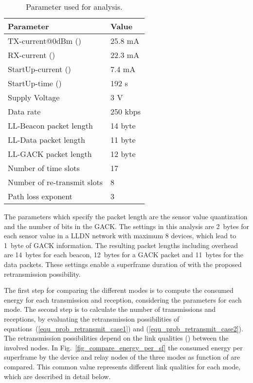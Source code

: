 \documentclass[times,10pt,twocolumn]{article}
\begin{document}
\begin{table}[h!]
\caption{Parameter used for analysis.}
\label{table_parameter}
\begin{tabular*}{8.1cm}{ll}
\hline
Parameter \hspace{4cm} & Value   \\ \hline
TX-current@0dBm () & 25.8 mA \\
RX-current () & 22.3 mA\\
StartUp-current () & 7.4 mA\\
StartUp-time () & 192 s\\
Supply Voltage & 3 V \\
Data rate & 250 kbps \\
LL-Beacon packet length & 14 byte\\
LL-Data packet length & 11 byte\\
LL-GACK packet length & 12 byte\\
Number of time slots  & 17 \\
Number of re-transmit slots  & 8 \\
Path loss exponent  & 3 \\ \hline
\end{tabular*}
\end{table}


The parameters which specify the packet length are the sensor value quantization and the number of bits in the GACK. The settings in this analysis are 2~bytes for each sensor value in a LLDN network with maximum 8 devices, which lead to 1~byte of GACK information. The resulting packet lengths including overhead are 14~bytes for each beacon, 12~bytes for a GACK packet and 11~bytes for the data packets. These settings enable a superframe duration of  with the proposed retransmission possibility.

The first step for comparing the different modes is to compute the consumed energy for each transmission and reception, considering the parameters for each mode. The second step is to calculate the number of transmissions and receptions, by evaluating the retransmission possibilities of equations~(\ref{equ_prob_retransmit_case1}) and (\ref{equ_prob_retransmit_case2}). The retransmission possibilities depend on the link qualities () between the involved nodes. In Fig.~\ref{fig_compare_energy_per_sf} the consumed energy per superframe by the device and relay nodes of the three modes as function of  are compared. This common  value represents different link qualities for each mode, which are described in detail below.
\end{document}
